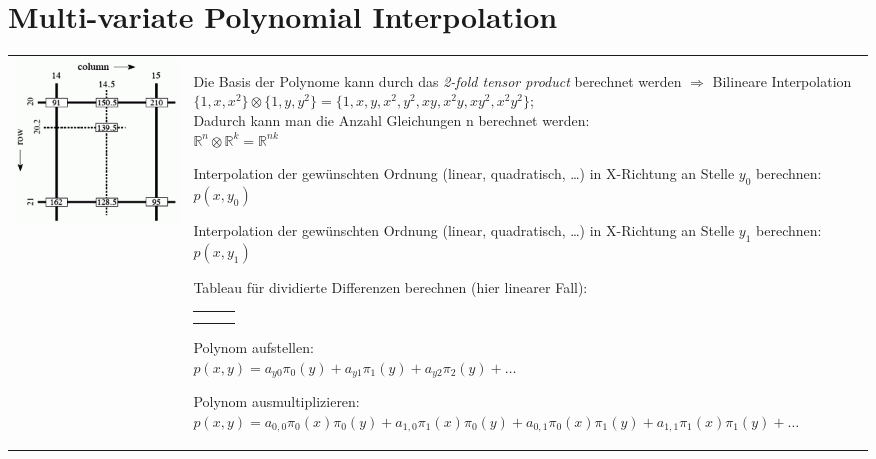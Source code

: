 \section{Multi-variate Polynomial Interpolation}
\begin{tabular}{ll}
  \parbox{6cm}{
    \includegraphics[width=6cm]{./bilder/bilineare_interpolation}
  }
  & \parbox{12.5cm} {
    \begin{aufzaehlung}
      \item 
        Die Basis der Polynome kann durch das \emph{2-fold tensor product} berechnet werden $\Rightarrow$ Bilineare Interpolation \\
        $\{1,x,x^2\} \otimes \{1, y, y^2\} = \{1,x,y,x^2,y^2,xy, x^2y, xy^2, x^2y^2\}$; \\
        Dadurch kann man die Anzahl Gleichungen n berechnet werden: \\$\mathbb R^n \otimes \mathbb R^k = \mathbb R^{nk}$
      \item Interpolation der gewünschten Ordnung (linear, quadratisch, \ldots) in X-Richtung an 
        Stelle $y_0$ berechnen: $p(x,y_0)$
      \item Interpolation der gewünschten Ordnung (linear, quadratisch, \ldots) in X-Richtung an 
        Stelle $y_1$ berechnen: $p(x,y_1)$
      \item Tableau für dividierte Differenzen berechnen (hier linearer Fall):\\
        \begin{tabular}{l|ll}
          $y$ & $z$\\
          \hline
          $y_0$ & $p(x,y_0) = a_{y0}$\\
          $y_1$ & $p(x,y_1)$ & $\frac{p(x,y_1) - p(x,y_0)}{y_1-y_0} = a_{y1}$
        \end{tabular}
      \item Polynom aufstellen:\\
        $p(x,y) = a_{y0} \pi_0(y) + a_{y1} \pi_1(y) + a_{y2} \pi_2(y)+\ldots$
      \item Polynom ausmultiplizieren:\\
          $p(x,y) = a_{0,0} \pi_0(x)\pi_0(y) + a_{1,0} \pi_1(x)\pi_0(y) + a_{0,1} \pi_0(x)\pi_1(y) + a_{1,1} \pi_1(x)\pi_1(y)+\ldots$ 
    \end{aufzaehlung}
  }

\end{tabular}

